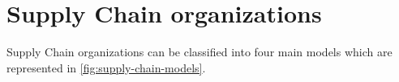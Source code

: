



\section{Supply Chain organizations}


Supply Chain organizations can be classified into four main models \cite{arnold2007} which are represented in \cref{fig:supply-chain-models}.

